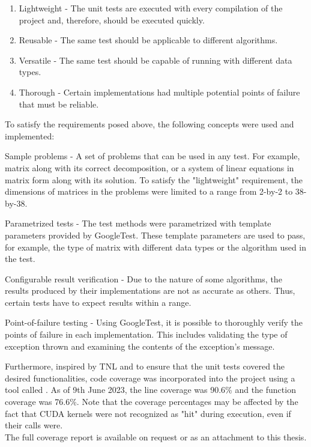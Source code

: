 \begin{enumerate}
	\item Lightweight - The unit tests are executed with every compilation of the project and, therefore, should be executed quickly.
	\item Reusable - The same test should be applicable to different algorithms.
	\item Versatile - The same test should be capable of running with different data types.
	\item Thorough - Certain implementations had multiple potential points of failure that must be reliable.
\end{enumerate}

To satisfy the requirements posed above, the following concepts were used and implemented:

\begin{tight_itemize}
	\item Sample problems - A set of problems that can be used in any test.
For example, matrix  along with its correct decomposition, or a system of linear equations in matrix form along with its solution.
To satisfy the "lightweight" requirement, the dimensions of matrices in the problems were limited to a range from 2-by-2 to 38-by-38.
	\item Parametrized tests - The test methods were parametrized with template parameters provided by GoogleTest.
These template parameters are used to pass, for example, the type of matrix with different data types or the algorithm used in the test.
	\item Configurable result verification - Due to the nature of some algorithms, the results produced by their implementations are not as accurate as others.
Thus, certain tests have to expect results within a range.
	\item Point-of-failure testing - Using GoogleTest, it is possible to thoroughly verify the points of failure in each implementation.
This includes validating the type of exception thrown and examining the contents of the exception's message.
\end{tight_itemize}

Furthermore, inspired by TNL and to ensure that the unit tests covered the desired functionalities, code coverage was incorporated into the project using a tool called  \cite{Cox2023}.
As of 9th June 2023, the line coverage was 90.6\% and the function coverage was 76.6\%.
Note that the coverage percentages may be affected by the fact that CUDA kernels were not recognized as "hit" during execution, even if their calls were.\\
The full coverage report is available on request or as an attachment to this thesis.



